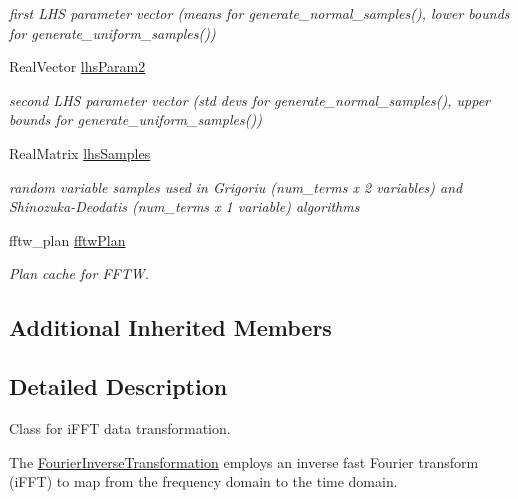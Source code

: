 \begin{DoxyCompactItemize}
\begin{DoxyCompactList}\small\item\em first L\+HS parameter vector (means for generate\+\_\+normal\+\_\+samples(), lower bounds for generate\+\_\+uniform\+\_\+samples()) \end{DoxyCompactList}\item 
Real\+Vector \hyperlink{classPecos_1_1FourierInverseTransformation_aeacf1f87e6b3e33d4fed439250089066}{lhs\+Param2}\label{classPecos_1_1FourierInverseTransformation_aeacf1f87e6b3e33d4fed439250089066}

\begin{DoxyCompactList}\small\item\em second L\+HS parameter vector (std devs for generate\+\_\+normal\+\_\+samples(), upper bounds for generate\+\_\+uniform\+\_\+samples()) \end{DoxyCompactList}\item 
Real\+Matrix \hyperlink{classPecos_1_1FourierInverseTransformation_a0ac2dc1881421113c2a365a6e306f1f9}{lhs\+Samples}\label{classPecos_1_1FourierInverseTransformation_a0ac2dc1881421113c2a365a6e306f1f9}

\begin{DoxyCompactList}\small\item\em random variable samples used in Grigoriu (num\+\_\+terms x 2 variables) and Shinozuka-\/\+Deodatis (num\+\_\+terms x 1 variable) algorithms \end{DoxyCompactList}\item 
fftw\+\_\+plan \hyperlink{classPecos_1_1FourierInverseTransformation_adc90e5fb3b914b14dc74e15e68d545dc}{fftw\+Plan}\label{classPecos_1_1FourierInverseTransformation_adc90e5fb3b914b14dc74e15e68d545dc}

\begin{DoxyCompactList}\small\item\em Plan cache for F\+F\+TW. \end{DoxyCompactList}\end{DoxyCompactItemize}
\subsection*{Additional Inherited Members}


\subsection{Detailed Description}
Class for i\+F\+FT data transformation. 

The \hyperlink{classPecos_1_1FourierInverseTransformation}{Fourier\+Inverse\+Transformation} employs an inverse fast Fourier transform (i\+F\+FT) to map from the frequency domain to the time domain. 

